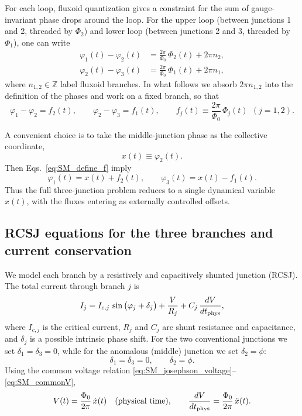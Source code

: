 \documentclass[prl,twocolumn,superscriptaddress,showpacs,nofootinbib]{revtex4-2}
\begin{document}
For each loop, fluxoid quantization gives a constraint for the sum of
gauge-invariant phase drops around the loop. For the upper loop (between
junctions 1 and 2, threaded by $\Phi_2$) and lower loop (between junctions 2 and
3, threaded by $\Phi_1$), one can write
\begin{align}
\varphi_1(t)-\varphi_2(t)
&= \frac{2\pi}{\Phi_0}\,\Phi_2(t) + 2\pi n_2,
\label{eq:SM_constraint_upper}
\\
\varphi_2(t)-\varphi_3(t)
&= \frac{2\pi}{\Phi_0}\,\Phi_1(t) + 2\pi n_1,
\label{eq:SM_constraint_lower}
\end{align}
where $n_{1,2}\in\mathbb{Z}$ label fluxoid branches. In what follows we absorb
$2\pi n_{1,2}$ into the definition of the phases and work on a fixed branch,
so that
\begin{equation}
\varphi_1-\varphi_2 = f_2(t),
\qquad
\varphi_2-\varphi_3 = f_1(t),
\qquad
f_j(t)\equiv\frac{2\pi}{\Phi_0}\,\Phi_j(t)\ \ (j=1,2).
\label{eq:SM_define_f}
\end{equation}

A convenient choice is to take the middle-junction phase as the collective
coordinate,
\begin{equation}
x(t)\equiv \varphi_2(t).
\label{eq:SM_define_x}
\end{equation}
Then Eqs.~\eqref{eq:SM_define_f} imply
\begin{equation}
\varphi_1(t)=x(t)+f_2(t),
\qquad
\varphi_3(t)=x(t)-f_1(t).
\label{eq:SM_gamma123}
\end{equation}
Thus the full three-junction problem reduces to a single dynamical variable
$x(t)$, with the fluxes entering as externally controlled offsets.

\subsection{RCSJ equations for the three branches and current conservation}
\label{sec:SM_RCSJ}
We model each branch by a resistively and capacitively shunted junction (RCSJ).
The total current through branch $j$ is
\begin{equation}
I_j
=
I_{c,j}\, \sin\big(\varphi_j+\delta_j\big)
+\frac{V}{R_j}
+C_j\,\frac{dV}{dt_{\rm phys}},
\label{eq:SM_RCSJ_general}
\end{equation}
where $I_{c,j}$ is the critical current, $R_j$ and $C_j$ are shunt resistance
and capacitance, and $\delta_j$ is a possible intrinsic phase shift.
For the two conventional junctions we set $\delta_1=\delta_3=0$, while for the
anomalous (middle) junction we set $\delta_2=\phi$:
\begin{equation}
\delta_1=\delta_3=0,
\qquad
\delta_2=\phi.
\label{eq:SM_delta}
\end{equation}
Using the common voltage relation \eqref{eq:SM_josephson_voltage}--\eqref{eq:SM_commonV},
\begin{equation}
V(t)=\frac{\Phi_0}{2\pi}\,\dot x(t)\quad\text{(physical time)},
\qquad
\frac{dV}{dt_{\rm phys}}=\frac{\Phi_0}{2\pi}\,\ddot x(t).
\label{eq:SM_V_in_terms_of_x}
\end{equation}
\end{document}
